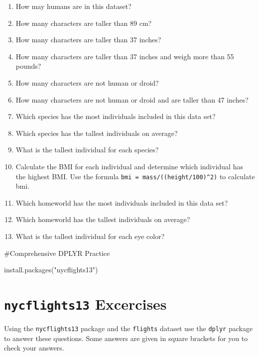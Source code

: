 \documentclass[
]{book}
\newenvironment{Shaded}{\begin{snugshade}}{\end{snugshade}}
\newcommand{\FunctionTok}[1]{\textcolor[rgb]{0.00,0.00,0.00}{#1}}
\newcommand{\NormalTok}[1]{#1}
\newcommand{\StringTok}[1]{\textcolor[rgb]{0.31,0.60,0.02}{#1}}
\providecommand{\tightlist}{%
  \setlength{\itemsep}{0pt}\setlength{\parskip}{0pt}}
\begin{document}
\begin{enumerate}
\def\labelenumi{\arabic{enumi}.}
\tightlist
\item
  How may humans are in this dataset?
\item
  How many characters are taller than 89 cm?
\item
  How many characters are taller than 37 inches?
\item
  How many characters are taller than 37 inches and weigh more than 55 pounds?
\item
  How many characters are not human or droid?
\item
  How many characters are not human or droid and are taller than 47 inches?
\item
  Which species has the most individuals included in this data set?
\item
  Which species has the tallest individuals on average?
\item
  What is the tallest individual for each species?
\item
  Calculate the BMI for each individual and determine which individual has the highest BMI. Use the formula \texttt{bmi\ =\ mass/((height/100)\^{}2)} to calculate bmi.
\item
  Which homeworld has the most individuals included in this data set?
\item
  Which homeworld has the tallest individuals on average?
\item
  What is the tallest individual for each eye color?
\end{enumerate}

\#Comprehensive DPLYR Practice

\begin{Shaded}
\begin{Highlighting}[]
\FunctionTok{install.packages}\NormalTok{(}\StringTok{"nycflights13"}\NormalTok{)}
\end{Highlighting}
\end{Shaded}

\hypertarget{nycflights13-excercises}{%
\section{\texorpdfstring{\texttt{nycflights13} Excercises}{nycflights13 Excercises}}\label{nycflights13-excercises}}

Using the \texttt{nycflights13} package and the \texttt{flights} dataset use the \texttt{dplyr} package to answer these questions. Some answers are given in square brackets for you to check your answers.
\end{document}
